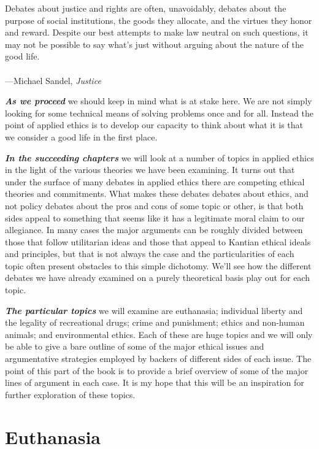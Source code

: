 \documentclass[
  12pt, openany]{book}
\newenvironment{epigraph}%
{
\begin{flushright}
\begin{minipage}{30em}
\begin{flushright}
\itshape
}%
{
\end{flushright}
\end{minipage}
\end{flushright}
\vspace{1em}
}
\theoremstyle{definition}
\theoremstyle{definition}
\theoremstyle{definition}
\theoremstyle{definition}
\theoremstyle{remark}
\begin{document}
\begin{epigraph}
Debates about justice and rights are often, unavoidably, debates about the purpose of social institutions, the goods they allocate, and the virtues they honor and reward. Despite our best attempts to make law neutral on such questions, it may not be possible to say what's just without arguing about the nature of the good life.\\
~\\
---Michael Sandel, \emph{Justice}

\end{epigraph}

\textbf{\emph{As we proceed}} we should keep in mind what is at stake here. We are not simply looking for some technical means of solving problems once and for all. Instead the point of applied ethics is to develop our capacity to think about what it is that we consider a good life in the first place.

\textbf{\emph{In the succeeding chapters}} we will look at a number of topics in applied ethics in the light of the various theories we have been examining. It turns out that under the surface of many debates in applied ethics there are competing ethical theories and commitments. What makes these debates debates about ethics, and not policy debates about the pros and cons of some topic or other, is that both sides appeal to something that seems like it has a legitimate moral claim to our allegiance. In many cases the major arguments can be roughly divided between those that follow utilitarian ideas and those that appeal to Kantian ethical ideals and principles, but that is not always the case and the particularities of each topic often present obstacles to this simple dichotomy. We'll see how the different debates we have already examined on a purely theoretical basis play out for each topic.

\textbf{\emph{The particular topics}} we will examine are euthanasia; individual liberty and the legality of recreational drugs; crime and punishment; ethics and non-human animals; and environmental ethics. Each of these are huge topics and we will only be able to give a bare outline of some of the major ethical issues and argumentative strategies employed by backers of different sides of each issue. The point of this part of the book is to provide a brief overview of some of the major lines of argument in each case. It is my hope that this will be an inspiration for further exploration of these topics.

\hypertarget{euthanasia}{%
\chapter{Euthanasia}\label{euthanasia}}
\end{document}
